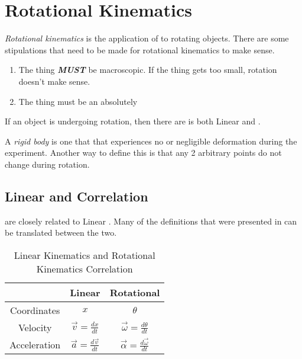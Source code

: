 \section{Rotational Kinematics} \label{sec:Rotational Kinematics}
\begin{definition} \label{def:Rotational Kinematics}
  \emph{Rotational kinematics} is the application of  to rotating objects.
  There are some stipulations that need to be made for rotational kinematics to make sense.

  \begin{enumerate}
    \item The thing \textbf{\emph{MUST}} be macroscopic. If the thing gets too small, rotation doesn't make sense.
    \item The thing must be an absolutely 
  \end{enumerate}

  If an object is undergoing rotation, then there are is both Linear  and .
\end{definition}

\begin{definition} \label{def:Rigid Body}
  A \emph{rigid body} is one that that experiences no or negligible deformation during the experiment.
  Another way to define this is that any 2 arbitrary points do not change during rotation.
\end{definition}

\subsection{Linear  and  Correlation} \label{subsec:Linear Kinematics Rotational Kinematics Correlation}
 are closely related to Linear .
Many of the definitions that were presented in  can be translated between the two.

\begin{table}[h!] %
  \centering
  \renewcommand{\arraystretch}{1.4} %
  \begin{tabular}{ccc}
     & Linear & Rotational \\ \hline
    Coordinates & $x$ & $\theta$ \\ \hline
    Velocity & $\vec{v} = \frac{dx}{dt}$ & $\vec{\omega} = \frac{d \theta}{dt}$ \\ \hline
    Acceleration & $\vec{a} = \frac{d \vec{v}}{dt}$ & $\vec{\alpha} = \frac{d \vec{\omega}}{dt}$ \\ \hline
  \end{tabular}
  \caption{Linear Kinematics and Rotational Kinematics Correlation}
  \label{tab:Linear Kinematics Rotational Kinematics Correlation}
\end{table}


